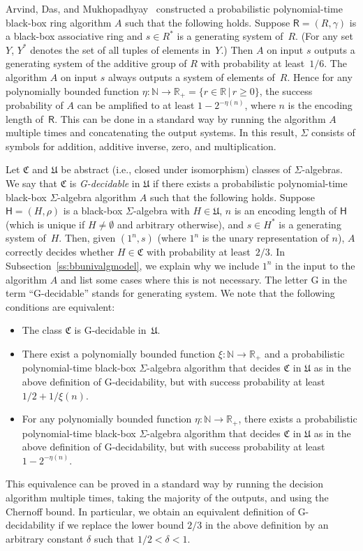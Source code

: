 \documentclass{jgcc}
\newcommand{\cl}{\mathfrak}
\newcommand{\bb}{\mathsf}
\newcommand{\st}{\,|\,}
\newcommand{\N}{\mathbb N}
\newcommand{\R}{\mathbb R}
\begin{document}
Arvind, Das, and Mukhopadhyay~\cite[Theorem~1 and its
proof]{ADM06} constructed a probabilistic polynomial-time
black-box ring algorithm $A$ such that the following holds.
Suppose $\bb R=(R,\gamma)$ is a black-box associative ring
and $s\in R^*$ is a generating system of~$R$. (For any set
$Y$, $Y^*$ denotes the set of all tuples of elements
in~$Y$.) Then $A$ on input $s$ outputs a generating system
of the additive group of $R$ with probability at
least~$1/6$. The algorithm $A$ on input $s$ always outputs a
system of elements of~$R$. Hence for any polynomially
bounded function $\eta\colon\N\to\R_+=\{r\in\R\st r\ge0\}$,
the success probability of $A$ can be amplified to at least
$1-2^{-\eta(n)}$, where $n$ is the encoding length of~$\bb
R$. This can be done in a standard way by running the
algorithm $A$ multiple times and concatenating the output
systems. In this result, $\Sigma$ consists of symbols for
addition, additive inverse, zero, and multiplication.

Let $\cl C$ and $\cl U$ be abstract (i.e., closed under
isomorphism) classes of $\Sigma$-algebras. We say that $\cl
C$ is \emph{G-decidable} in $\cl U$ if there exists a
probabilistic polynomial-time black-box $\Sigma$-algebra
algorithm $A$ such that the following holds. Suppose $\bb
H=(H,\rho)$ is a black-box $\Sigma$-algebra with $H\in\cl
U$, $n$ is an encoding length of $\bb H$ (which is unique if
$H\ne\emptyset$ and arbitrary otherwise), and $s\in H^*$ is
a generating system of~$H$. Then, given $(1^n,s)$ (where
$1^n$ is the unary representation of $n$), $A$ correctly
decides whether $H\in\cl C$ with probability at least~$2/3$.
In Subsection~\ref{ss:bbunivalgmodel}, we explain why we
include $1^n$ in the input to the algorithm $A$ and list
some cases where this is not necessary. The letter G in the
term ``G-decidable'' stands for generating system. We note
that the following conditions are equivalent:
\begin{itemize}
\item The class $\cl C$ is G-decidable in~$\cl U$.

\item There exist a polynomially bounded function
$\xi\colon\N\to\R_+$ and a probabilistic polynomial-time
black-box $\Sigma$-algebra algorithm that decides $\cl C$ in
$\cl U$ as in the above definition of G-decidability, but
with success probability at least $1/2+1/\xi(n)$.

\item For any polynomially bounded function
$\eta\colon\N\to\R_+$, there exists a probabilistic
polynomial-time black-box $\Sigma$-algebra algorithm that
decides $\cl C$ in $\cl U$ as in the above definition of
G-decidability, but with success probability at least
$1-2^{-\eta(n)}$.
\end{itemize}
This equivalence can be proved in a standard way by running
the decision algorithm multiple times, taking the majority
of the outputs, and using the Chernoff bound. In particular,
we obtain an equivalent definition of G-decidability if we
replace the lower bound $2/3$ in the above definition by an
arbitrary constant $\delta$ such that $1/2<\delta<1$.
\end{document}
